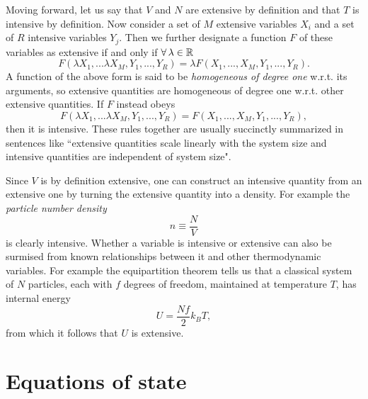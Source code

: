 Moving forward, let us say that $V$ and $N$ are extensive by definition and that
$T$ is intensive by definition. Now consider a set of $M$ extensive variables 
${X_i}$ and a set of $R$ intensive variables ${Y_j}$. Then we further designate 
a function $F$ of these variables as extensive if and only if $\operatorname{\forall}\lambda\in\mathbb{R}$
\begin{equation}\label{eq:extensive}
F(\lambda X_1, ... \lambda X_M,Y_1,...,Y_R)=\lambda F(X_1,...,X_M,Y_1,...,Y_R).
\end{equation}
A function of the above form is said to be {\it homogeneous of degree
one} w.r.t. its arguments, so extensive quantities are
homogeneous of degree one w.r.t. other extensive quantities. If $F$ instead obeys
\begin{equation}\label{eq:intensive}
F(\lambda X_1, ... \lambda X_M,Y_1,...,Y_R)= F(X_1,...,X_M,Y_1,...,Y_R),
\end{equation}
then it is intensive. These rules together are usually succinctly summarized in
sentences like ``extensive quantities scale linearly with the system size and
intensive quantities are independent of system size".

Since $V$ is by definition extensive, one can construct an intensive quantity
from an extensive one by turning the extensive quantity into a density. For
example the {\it particle number density}
\begin{equation}
n\equiv \frac{N}{V}
\end{equation}
is clearly intensive. Whether a variable is intensive or extensive can also be
surmised from known relationships between it and other thermodynamic variables.
For example the equipartition theorem tells us that a classical system of $N$
particles, each with $f$ degrees of freedom, maintained at temperature $T$, has
internal energy
\begin{equation}
U=\frac{Nf}{2}k_B T,
\end{equation}  
from which it follows that $U$ is extensive.


\section{Equations of state}\label{sec:EoS}



